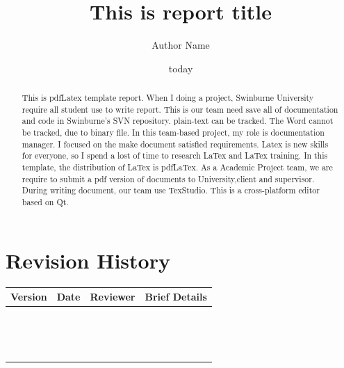 \documentclass[12pt,a4paper]{report}
\begin{document}

\title{This is report title}
\author{Author Name}
\date{today}
\maketitle

\renewcommand*\thesection{\Large{\arabic{section}}}
\section*{Revision History}
	\begin{table}[h!]
		\centering
		\begin{longtable}{|c|c|c|p{7cm}|} \hline
			\textbf{Version} & \textbf{Date} & \textbf{Reviewer} & \textbf{Brief Details} \\\hline
			\endhead
			\endfoot
			\endlastfoot
			& & & \\\hline
			& & & \\\hline
			& & & \\\hline
			& & & \\\hline
			& & & \\\hline
			& & & \\\hline
			& & & \\\hline
			& & & \\\hline
			& & & \\\hline
			& & & \\\hline
			& & & \\\hline
			& & & \\\hline
			& & & \\\hline
			& & & \\\hline
			& & & \\\hline
		\end{longtable}
	\end{table}
\pagebreak

\renewcommand{\abstractname}{Executive Summary}
\begin{abstract}
This is pdfLatex template report. When I doing a project, Swinburne University require all student use to write report. This is our team need save all of documentation and code in Swinburne's SVN repository. plain-text can be tracked. The Word cannot be tracked, due to binary file. In this team-based project, my role is documentation manager. I focused on the make document satisfied requirements. Latex is new skills for everyone, so I spend a lost of time to research LaTex and LaTex training. In this template, the distribution of LaTex is pdfLaTex. As a Academic Project team, we are require to submit a pdf version of documents to University,client and supervisor. During writing document, our team use TexStudio. This is a cross-platform editor based on Qt.

\end{abstract}
\end{document}
